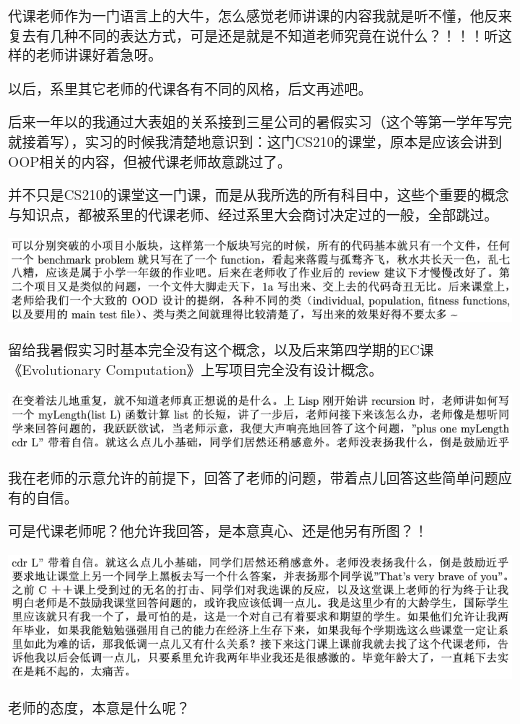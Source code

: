 \documentclass[9pt, b5paper]{article}
\begin{document}
代课老师作为一门语言上的大牛，怎么感觉老师讲课的内容我就是听不懂，他反来复去有几种不同的表达方式，可是还是就是不知道老师究竟在说什么？！！！听这样的老师讲课好着急呀。 

以后，系里其它老师的代课各有不同的风格，后文再述吧。 

后来一年以的我通过大表姐的关系接到三星公司的暑假实习（这个等第一学年写完就接着写），实习的时候我清楚地意识到：这门CS210的课堂，原本是应该会讲到OOP相关的内容，但被代课老师故意跳过了。

并不只是CS210的课堂这一门课，而是从我所选的所有科目中，这些个重要的概念与知识点，都被系里的代课老师、经过系里大会商讨决定过的一般，全部跳过。

\begin{center}
\includegraphics[width=.9\linewidth]{./pic/backups_plans_20210425_151137.png}
\end{center}

留给我暑假实习时基本完全没有这个概念，以及后来第四学期的EC课《Evolutionary Computation》上写项目完全没有设计概念。

\begin{center}
\includegraphics[width=.9\linewidth]{./pic/backups_plans_20210424_204032.png}
\end{center}

我在老师的示意允许的前提下，回答了老师的问题，带着点儿回答这些简单问题应有的自信。

可是代课老师呢？他允许我回答，是本意真心、还是他另有所图？！

\begin{center}
\includegraphics[width=.9\linewidth]{./pic/backups_plans_20210424_204405.png}
\end{center}

老师的态度，本意是什么呢？
\end{document}

